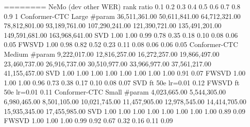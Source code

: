 ========
NeMo
(dev other WER)	rank ratio	0.1	0.2	0.3	0.4	0.5	0.6	0.7	0.8	0.9	1
Conformer-CTC Large	#param	 36,511,361.00 	 50,611,841.00 	 64,712,321.00 	 78,812,801.00 	 93,189,761.00 	 107,290,241.00 	 121,390,721.00 	 135,491,201.00 	 149,591,681.00 	 163,968,641.00 
	SVD	1.00	1.00	0.99	0.78	0.35	0.18	0.10	0.08	0.06	0.05
	FWSVD	1.00	0.98	0.82	0.52	0.23	0.11	0.08	0.06	0.06	0.05
Conformer-CTC Medium	#param	 9,222,017.00 	 12,816,257.00 	 16,272,257.00 	 19,866,497.00 	 23,460,737.00 	 26,916,737.00 	 30,510,977.00 	 33,966,977.00 	 37,561,217.00 	 41,155,457.00 
	SVD	1.00	1.00	1.00	1.00	1.00	1.00	1.00	1.00	0.91	0.07
	FWSVD	1.00	1.00	1.00	0.96	0.73	0.38	0.17	0.10	0.08	0.07
	SVD ft 50e lr=0.01						0.12				
	FWSVD ft 50e lr=0.01						0.11				
Conformer-CTC Small	#param	 4,023,665.00 	 5,544,305.00 	 6,980,465.00 	 8,501,105.00 	 10,021,745.00 	 11,457,905.00 	 12,978,545.00 	 14,414,705.00 	 15,935,345.00 	 17,455,985.00 
	SVD	1.00	1.00	1.00	1.00	1.00	1.00	1.00	1.00	0.89	0.09
	FWSVD	1.00	1.00	1.00	0.99	0.92	0.67	0.32	0.16	0.11	0.09